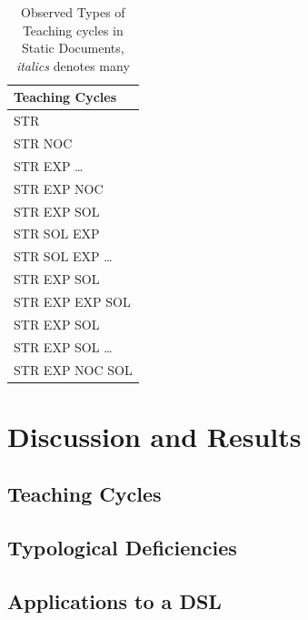 \documentclass[conference]{IEEEtran}
\begin{document}
  \begin{table}[h]
  \begin{center}
    \begin{tabular}{| l |}
      \hline
      Teaching Cycles \\ \hline
      STR \\ \hline
      STR NOC \\ \hline
      STR EXP \ldots \\ \hline
      STR EXP NOC \\ \hline
      STR EXP SOL \\ \hline
      STR SOL EXP \\ \hline
      STR SOL EXP \ldots \\ \hline
      STR EXP SOL \\ \hline
      STR EXP EXP SOL \\ \hline
      STR EXP SOL \\ \hline
      STR EXP SOL \ldots \\ \hline
      STR EXP NOC SOL \\ \hline
      \hline
    \end{tabular}
    \caption{Observed Types of Teaching cycles in Static Documents,
      \emph{italics} denotes many}
  \end{center}
  \end{table}

\section{Discussion and Results}

\subsection{Teaching Cycles}
\subsection{Typological Deficiencies}
\subsection{Applications to a DSL}
\end{document}
